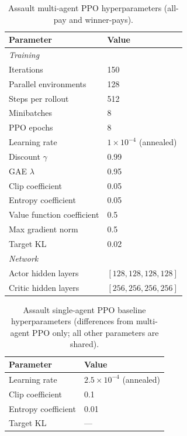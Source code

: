 \begin{table}[h]
\centering
\begin{tabular}{ll}
\toprule
Parameter & Value \\
\midrule
\multicolumn{2}{l}{\textit{Training}} \\
Iterations & 150 \\
Parallel environments & 128 \\
Steps per rollout & 512 \\
Minibatches & 8 \\
PPO epochs & 8 \\
Learning rate & $1 \times 10^{-4}$ (annealed) \\
Discount $\gamma$ & 0.99 \\
GAE $\lambda$ & 0.95 \\
Clip coefficient & 0.05 \\
Entropy coefficient & 0.05 \\
Value function coefficient & 0.5 \\
Max gradient norm & 0.5 \\
Target KL & 0.02 \\
\midrule
\multicolumn{2}{l}{\textit{Network}} \\
Actor hidden layers & $[128, 128, 128, 128]$ \\
Critic hidden layers & $[256, 256, 256, 256]$ \\
\bottomrule
\end{tabular}
\caption{Assault multi-agent PPO hyperparameters (all-pay and winner-pays).}
\end{table}

\begin{table}[h]
\centering
\begin{tabular}{ll}
\toprule
Parameter & Value \\
\midrule
Learning rate & $2.5 \times 10^{-4}$ (annealed) \\
Clip coefficient & 0.1 \\
Entropy coefficient & 0.01 \\
Target KL & --- \\
\bottomrule
\end{tabular}
\caption{Assault single-agent PPO baseline hyperparameters (differences from multi-agent PPO only; all other parameters are shared).}
\end{table}

